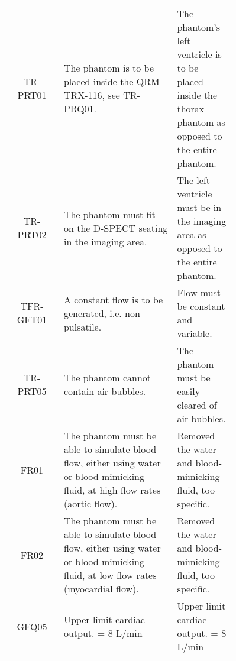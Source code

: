 {\begin{longtable}{|c|p{0.5\linewidth}|p{0.26\linewidth}|}
	TR-PRT01 & The phantom is to be placed inside the QRM TRX-116, see TR-PRQ01. & The phantom's left ventricle is to be placed inside the thorax phantom as opposed to the entire phantom.\\
	TR-PRT02 & The phantom must fit on the D-SPECT seating in the imaging area. & The left ventricle must be in the imaging area as opposed to the entire phantom.\\
	TFR-GFT01 & A constant flow is to be generated, i.e. non-pulsatile. & Flow must be constant and variable.\\
	TR-PRT05 			& The phantom cannot contain air bubbles. & The phantom must be easily cleared of air bubbles. \\
	FR01				& The phantom must be able to simulate blood flow, either using water or blood-mimicking fluid, at high flow rates (aortic flow). & Removed the water and blood-mimicking fluid, too specific. \\
	FR02				& The phantom must be able to simulate blood flow, either using water or blood mimicking fluid, at low flow rates (myocardial flow). & Removed the water and blood-mimicking fluid, too specific. \\
	GFQ05 				& Upper limit cardiac output. = 8 L/min & Upper limit cardiac output. = 8 L/min \\
		\hline
	\end{longtable}
}

\normalsize